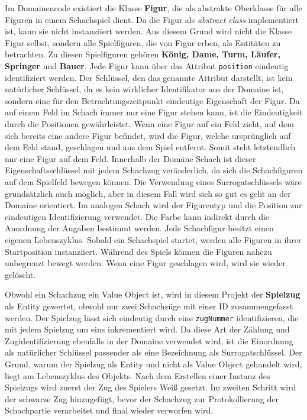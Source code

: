 Im Domainencode existiert die Klasse \textbf{Figur}, die als abstrakte Oberklasse für alle Figuren in einem Schachspiel dient. 
Da die Figur als \textit{abstract class} implementiert ist, kann sie nicht instanziiert werden. 
Aus diesem Grund wird nicht die Klasse Figur selbst, sondern alle Spielfiguren, die von Figur erben, als Entitäten zu betrachten. 
Zu diesen Spielfiguren gehören \textbf{König, Dame, Turm, Läufer, Springer} und \textbf{Bauer}.
Jede Figur kann über das Attribut \texttt{position} eindeutig identifiziert werden.
Der Schlüssel, den das genannte Attribut darstellt, ist kein natürlicher Schlüssel, da es kein wirklicher Identifikator aus der Domaine ist, sondern eine für den Betrachtungszeitpunkt eindeutige Eigenschaft der Figur. 
Da auf einem Feld im Schach immer nur eine Figur stehen kann, ist die Eindeutigkeit durch die Positionen gewährleistet. 
Wenn eine Figur auf ein Feld zieht, auf dem sich bereits eine andere Figur befindet, wird die Figur, welche ursprünglich auf dem Feld stand, geschlagen und aus dem Spiel entfernt. 
Somit steht letztendlich nur eine Figur auf dem Feld. 
Innerhalb der Domäne \glqq Schach\grqq{} ist dieser Eigenschaftsschlüssel mit jedem Schachzug veränderlich, da sich die Schachfiguren auf dem Spielfeld bewegen können. 
Die Verwendung eines Surrogatschlüssels wäre grundsätzlich auch möglich, aber in diesem Fall wird sich so gut es geht an der Domaine orientiert. 
Im analogen Schach wird der Figurentyp und die Position zur eindeutigen Identifizierung verwendet. 
Die Farbe kann indirekt durch die Anordnung der Angaben bestimmt werden.
Jede Schachfigur besitzt einen eigenen Lebenszyklus.
Sobald ein Schachspiel startet, werden alle Figuren in ihrer Startposition instanziiert.
Während des Spiels können die Figuren nahezu unbegrenzt bewegt werden. 
Wenn eine Figur geschlagen wird, wird sie wieder gelöscht. 

Obwohl ein Schachzug ein Value Object ist, wird in diesem Projekt der \textbf{Spielzug} als Entity gewertet, obwohl nur zwei Schachzüge mit einer ID zusammengefasst werden. 
Der Spielzug lässt sich eindeutig durch eine \texttt{zugNummer} identifizieren, die mit jedem Spielzug um eins inkrementiert wird.
Da diese Art der Zählung und Zugidentifizierung ebenfalls in der Domaine verwendet wird, ist die Einordnung als natürlicher Schlüssel passender als eine Bezeichnung als Surrogatschlüssel.
Der Grund, warum der Spielzug als Entity und nicht als Value Object gehandelt wird, liegt am Lebenszyklus des Objekts. 
Nach dem Erstellen einer Instanz des Spielzugs wird zuerst der Zug des Spielers \glqq Weiß\grqq{} gesetzt.
Im zweiten Schritt wird der schwarze Zug hinzugefügt, bevor der Schachzug zur Protokollierung der Schachpartie verarbeitet und final wieder verworfen wird.  

